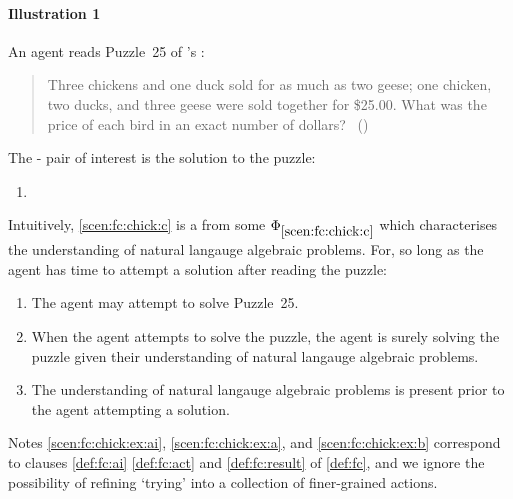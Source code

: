 \paragraph{Illustration 1}


\begin{note}
  \begin{scenario}[Paltry]
    \label{scen:fc:chick}%
    An agent reads Puzzle~25 of \citeauthor{Dudeney:1995aa}'s :
    \begin{quote}
      Three chickens and one duck sold for as much as two geese; one chicken, two ducks, and three geese were sold together for \$25.00. What was the price of each bird in an exact number of dollars?%
      \mbox{ }\hfill\mbox{(\citeyear[9]{Dudeney:1995aa})}
    \end{quote}
    \vspace{-\baselineskip}
  \end{scenario}

  \noindent%
  The - pair of interest is the solution to the puzzle:
  \begin{enumerate}[label=C\thescenarioCounter., ref=C\thescenarioCounter]
  \item
    \label{scen:fc:chick:c}
  \end{enumerate}
  Intuitively, \ref{scen:fc:chick:c} is a \fc{} from some \pool{} \(\Phi_{\ref{scen:fc:chick:c}}\) which characterises the \agents{} understanding of natural langauge algebraic problems.
  For, so long as the agent has time to attempt a solution after reading the puzzle:
  \begin{enumerate}[label=\alph*., ref=\alph*]
  \item
    \label{scen:fc:chick:ex:ai}
    The agent may attempt to solve Puzzle~25.
  \item
    \label{scen:fc:chick:ex:a}
    When the agent attempts to solve the puzzle, the agent is surely solving the puzzle given their understanding of natural langauge algebraic problems.
  \item
    \label{scen:fc:chick:ex:b}
    The \agents{} understanding of natural langauge algebraic problems is present prior to the agent attempting a solution.
  \end{enumerate}
  Notes \ref{scen:fc:chick:ex:ai}, \ref{scen:fc:chick:ex:a}, and \ref{scen:fc:chick:ex:b} correspond to clauses \ref{def:fc:ai} \ref{def:fc:act} and \ref{def:fc:result} of \autoref{def:fc}, and we ignore the possibility of refining `trying' into a collection of finer-grained actions.
\end{note}


